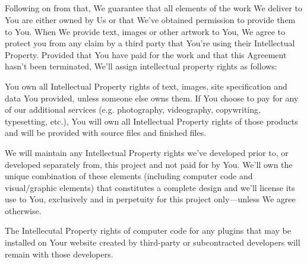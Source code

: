 {  \subsection{}
  Following on from that, We guarantee that all elements of the work We deliver to You are either owned by Us or that We’ve obtained permission to provide them to You. When We provide text, images or other artwork to You, We agree to protect you from any claim by a third party that You’re using their Intellectual Property. Provided that You have paid for the work and that this Agreement hasn’t been terminated, We’ll assign intellectual property rights as follows:
    \begin{longenum}
      \item You own all Intellectual Property rights of text, images, site specification and data You provided, unless someone else owns them. If You choose to pay for any of our additional services (e.g. photography, videography, copywriting, \latex typesetting, etc.), You will own all Intellectual Property rights of those products and will be provided with source files and finished files.
      \item We will maintain any Intellectual Property rights we’ve developed prior to, or developed separately from, this project and not paid for by You. We’ll own the unique combination of these elements (including computer code and visual/graphic elements) that constitutes a complete design and we’ll license its use to You, exclusively and in perpetuity for this project only—unless We agree otherwise.
      \item The Intellecutal Property rights of computer code for any plugins that may be installed on Your website created by third-party or subcontracted developers will remain with those developers.
    \end{longenum}
}
\newcommand{\securityobligations}{
    \section{Security Obligations}
    \clientbusinessname shall hold and maintain the Confidential Information in strictest confidence for the sole and exclusive benefit of \companyname. \clientbusinessname shall carefully restrict access to Confidential Information and PII to employees, contractors, and third parties as is reasonably required and shall require those persons to sign nondisclosure restrictions at least as protective as those in this Agreement. \clientbusinessname shall not, without prior written approval of \companyname, use for \clientbusinessname's own benefit, publish, copy, or otherwise disclose to others, or permit the use by others for their benefit or to the detriment of \companyname, any Confidential Information or PII. \clientbusinessname shall return to \companyname any and all records, notes, passwords, and other written, printed, or tangible materials in its possession pertaining to Confidential Information and PII immediately if \companyname so requests in writing.
}
